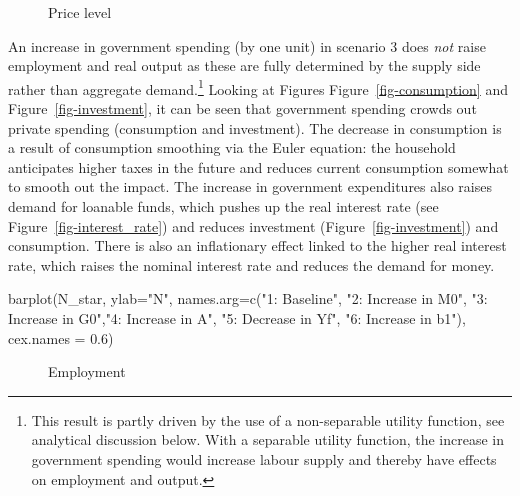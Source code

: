 \documentclass[
  letterpaper,
  DIV=11,
  numbers=noendperiod]{scrreprt}
\newenvironment{Shaded}{\begin{snugshade}}{\end{snugshade}}
\newcommand{\AttributeTok}[1]{\textcolor[rgb]{0.40,0.45,0.13}{#1}}
\newcommand{\FloatTok}[1]{\textcolor[rgb]{0.68,0.00,0.00}{#1}}
\newcommand{\FunctionTok}[1]{\textcolor[rgb]{0.28,0.35,0.67}{#1}}
\newcommand{\NormalTok}[1]{\textcolor[rgb]{0.00,0.23,0.31}{#1}}
\newcommand{\StringTok}[1]{\textcolor[rgb]{0.13,0.47,0.30}{#1}}
\begin{document}
\begin{figure}[H]


\caption{\label{fig-price_level}Price level}

\end{figure}%

An increase in government spending (by one unit) in scenario 3 does
\emph{not} raise employment and real output as these are fully
determined by the supply side rather than aggregate demand.\footnote{This
  result is partly driven by the use of a non-separable utility
  function, see analytical discussion below. With a separable utility
  function, the increase in government spending would increase labour
  supply and thereby have effects on employment and output.} Looking at
Figures Figure~\ref{fig-consumption} and Figure~\ref{fig-investment}, it
can be seen that government spending crowds out private spending
(consumption and investment). The decrease in consumption is a result of
consumption smoothing via the Euler equation: the household anticipates
higher taxes in the future and reduces current consumption somewhat to
smooth out the impact. The increase in government expenditures also
raises demand for loanable funds, which pushes up the real interest rate
(see Figure~\ref{fig-interest_rate}) and reduces investment
(Figure~\ref{fig-investment}) and consumption. There is also an
inflationary effect linked to the higher real interest rate, which
raises the nominal interest rate and reduces the demand for money.

\begin{Shaded}
\begin{Highlighting}[]
\FunctionTok{barplot}\NormalTok{(N\_star, }\AttributeTok{ylab=}\StringTok{"N"}\NormalTok{,  }\AttributeTok{names.arg=}\FunctionTok{c}\NormalTok{(}\StringTok{"1: Baseline"}\NormalTok{, }\StringTok{"2: Increase in M0"}\NormalTok{, }\StringTok{"3: Increase in G0"}\NormalTok{,}\StringTok{"4: Increase in A"}\NormalTok{, }\StringTok{"5: Decrease in Yf"}\NormalTok{, }\StringTok{"6: Increase in b1"}\NormalTok{), }\AttributeTok{cex.names =} \FloatTok{0.6}\NormalTok{)}
\end{Highlighting}
\end{Shaded}

\begin{figure}[H]


\caption{\label{fig-employment-neocl}Employment}

\end{figure}%
\end{document}
